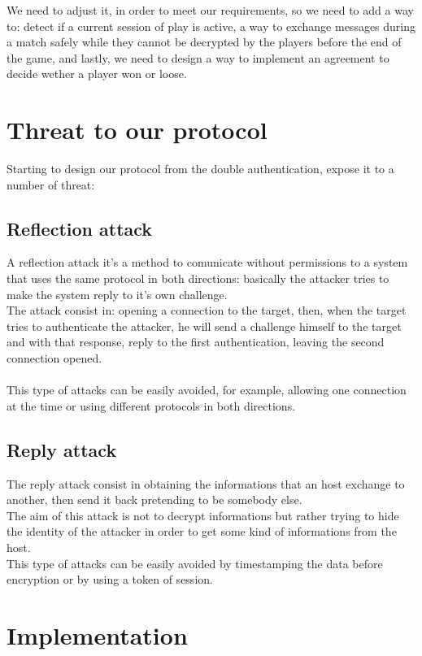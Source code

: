 \documentclass{article}
\begin{document}
We need to adjust it, in order to meet our requirements, so we need to add a way to: detect if a current session of play is active, a way to exchange messages during a match safely while they cannot be decrypted by the players before the end of the game, and lastly, we need to design a way to implement an agreement to decide wether a player won or loose.

\section{Threat to our protocol}

Starting to design our protocol from the double authentication, expose it to a number of threat:

\subsection{Reflection attack} 
A reflection attack it's a method to comunicate without permissions to a system that uses the same protocol in both directions: basically the attacker tries to make the system reply to it's own challenge.\\The attack consist in: opening a connection to the target, then, when the target tries to authenticate the attacker, he will send a challenge himself to the target and with that response, reply to the first authentication, leaving the second connection opened.\\\\
This type of attacks can be easily avoided, for example, allowing one connection at the time or using different protocols in both directions.

\subsection{Reply attack} 
The reply attack consist in obtaining the informations that an host exchange to another, then send it back pretending to be somebody else.\\
The aim of this attack is not to decrypt informations but rather trying to hide the identity of the attacker in order to get some kind of informations from the host.\\
This type of attacks can be easily avoided by timestamping the data before encryption or by using a token of session.

\section{Implementation}
\end{document}
